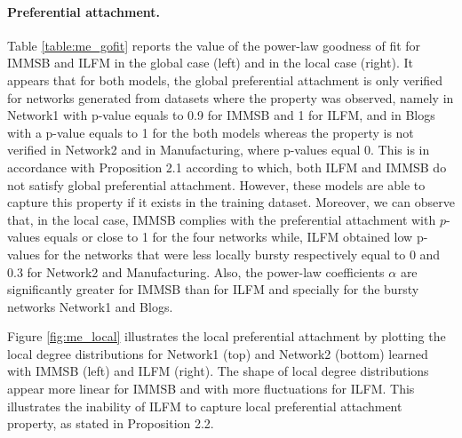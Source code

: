 \paragraph{Preferential attachment.} Table \ref{table:me_gofit} reports the value of the power-law goodness of fit for IMMSB and ILFM in the global case (left) and in the local case (right). It appears that for both models, the global preferential attachment is only verified for networks generated from datasets where the property was observed, namely in Network1 with p-value equals to 0.9 for IMMSB and 1 for ILFM, and in Blogs with a p-value equals to 1 for the both models whereas the property is not verified in Network2 and in Manufacturing, where p-values equal 0. This is in accordance with Proposition 2.1 according to which, both ILFM and IMMSB do not satisfy global preferential attachment. However, these models are able to capture this property if it exists in the training dataset.  Moreover, we can observe that, in the local case, IMMSB complies with the preferential attachment with $p$-values equals or close to 1 for the four networks while, ILFM obtained low p-values for the networks that were less locally bursty respectively equal to 0 and 0.3 for Network2 and Manufacturing. Also, the power-law coefficients $\alpha$ are significantly greater for IMMSB than for ILFM and specially for the bursty networks Network1 and Blogs.

Figure \ref{fig:me_local} illustrates the local preferential attachment by plotting the local degree distributions for Network1 (top) and Network2 (bottom) learned with IMMSB (left) and ILFM (right). The shape of local degree distributions appear more linear for IMMSB and with more fluctuations for ILFM. This illustrates the inability  of ILFM to capture local preferential attachment property,  as stated in Proposition 2.2. 

